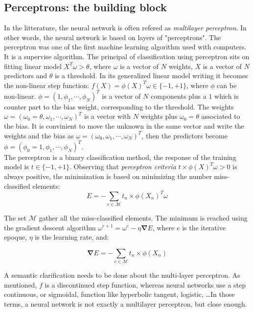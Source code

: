 \documentclass[final, paper=letter,5p,times,twocolumn]{elsarticle}
\begin{document}
\subsection{Perceptrons: the building block}
In the litterature, the neural network is often refered as {\it multilayer perceptron}. In other words, the neural network is based on layers of "perceptrons". The perceptron was one of the first machine learning algorithm used with computers. It is a supervise algorithm. The principal of classification using perceptron sits on fitting linear model $X^{T}\omega > \theta$, where $\omega$ is a vector of $N$ weights, $X$ is a vector of $N$ predictors and $\theta$ is a threshold. In its generalized linear model writing it becomes the non-linear step function: $f(X) = \phi(X)^{T}\omega \in \{-1,+1\}$, where $\phi$ can be non-linear. $\phi = (1, \phi_{1}, \cdots, \phi_{N})^{T}$ is a vector of $N$ components plus a $1$ which is counter part to the bias weight, corresponding to the threshold. The weights $\omega = (\omega_{0} = \theta, \omega_{1}, \cdots, \omega_{N})^{T}$ is a vector with $N$ weights plus $\omega_{0} = \theta$ associated to the bias. It is convinient to move the unknown in the same vector and write the weights and the bias as $\omega = (\omega_{0}, \omega_{1}, \cdots, \omega_{N})^{T}$, then the predictors become $\phi = (\phi_{0} = 1, \phi_{1}, \cdots, \phi_{N})^{T}$. \\
The perceptron is a binary classification method, the response of the training model is $t \in \{-1,+1\}$. Observing that {\it perceptron criteria} $t \times \phi(X)^{T}\omega > 0$ is always positive, the minimization is based on minimizing the number miss-classified elements: \\

\begin{equation}
E = - \sum_{c \in \mathcal{M}} t_{n} \times \phi(X_{n})^{T}\omega
\label{eq:Optimization_perceptron}
\end{equation}

The set $\mathcal{M}$ gather all the miss-classified elements. The minimum is reached using the gradient descent algorithm $\omega^{e+1} = \omega^{e} - \eta \bm{\nabla} E$, where $e$ is the iterative epoque, $\eta$ is the learning rate, and:

$$
\bm{\nabla} E = - \sum_{c \in \mathcal{M}} t_{n} \times \phi(X_{n})
$$

A semantic clarification needs to be done about the multi-layer perceptron. As mentioned, $f$ is a discontinued step function, whereas neural networks use a step continuous, or sigmoidal, function like hyperbolic tangent, logistic, \dots In those terms, a neural network is not exactly a multilayer perceptron, but close enough.
\end{document}
